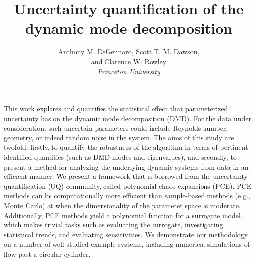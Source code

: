 \documentclass[12pt]{article}
\title{Uncertainty quantification of the dynamic mode decomposition}
\author{%
  Anthony M. DeGennaro, 
  Scott T. M. Dawson, \\ and
  Clarence W. Rowley\\
  \itshape
   Princeton University\\
 }
\begin{document}
\maketitle

 This work explores and quantifies the statistical effect that parameterized uncertainty has on the dynamic mode decomposition (DMD).
  For the data under consideration, such uncertain parameters could include Reynolds number, geometry, or indeed random noise in the system.
  The aims of this study are twofold: firstly, to quantify the robustness of the algorithm in terms of pertinent identified quantities (such as DMD modes and eigenvalues), 
  and secondly, to present a method for analyzing the underlying dynamic systems from data in an efficient manner.
  We present a framework that is borrowed from the uncertainty
  quantification (UQ) community, called polynomial chaos expansions
  (PCE). 
   PCE methods can be computationally more efficient than sample-based
  methods (e.g., Monte Carlo) at when the dimensionality of the
  parameter space is moderate. Additionally, PCE methods yield a polynomial
  function for a surrogate model, which makes trivial tasks such as
  evaluating the surrogate, investigating statistical trends, and
  evaluating sensitivities.
  We demonstrate our methodology on a number of well-studied example systems, including
 numerical simulations of flow past a circular cylinder.

\end{document}
